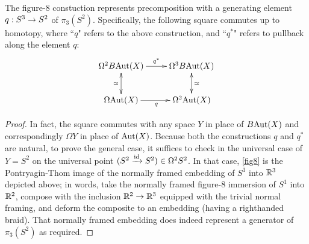 \documentclass{amsart}
\begin{document}
\begin{remark}
\end{remark}

\begin{lemma} 
\label{lemma-q}
The figure-8 constuction represents precomposition with a generating element $q: S^3 \rightarrow S^2$ of $\pi_3(S^2)$.  Specifically, the following square commutes up to homotopy, where ``$q$" refers to the above construction, and ``$q^\ast$" refers to pullback along the element $q$:
\[
\xymatrix{
\Omega^2 B\Aut(X) \ar[r]^{q^\ast} \ar@{<->}[d]_{\simeq} & \Omega^3 B\Aut(X)  \ar@{<->}[d]^{\simeq} \\
\Omega \Aut(X) \ar[r]_{q} & \Omega^2 \Aut(X)
}
\]
\end{lemma}

\begin{proof}
In fact, the square commutes with any space $Y$ in place of $B\mathrm{Aut}(X)$ and correspondingly $\Omega Y$ in place of $\mathrm{Aut}(X)$.  Because both the constructions $q$ and $q^\ast$ are natural, to prove the general case, it suffices to check in the universal case of $Y = S^2$ on the universal point $(S^2 \xrightarrow{\mathrm{id}} S^2) \in \Omega^2 S^2$.  In that case, \cref{fig8} is the Pontryagin-Thom image of the normally framed embedding of $S^1$ into $\mathbb R^3$ depicted above; in words, take the normally framed figure-8 immersion of $S^1$ into $\mathbb R^2$, compose with the inclusion $\mathbb R^2 \rightarrow \mathbb R^3$ equipped with the trivial normal framing, and deform the composite to an embedding (having a righthanded braid).  That normally framed embedding does indeed represent a generator of $\pi_3(S^2)$ as required.
\end{proof}
\end{document}
